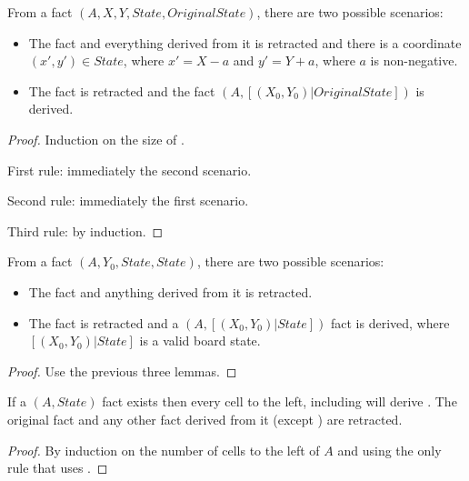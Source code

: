 \begin{lemma}
From a fact $(A, X, Y, State, OriginalState)$, there are
two possible scenarios:

\begin{itemize}
   \item The  fact and everything derived from it is
      retracted and there is a coordinate $(x', y') \in State$, where $x' = X -
      a$ and $y' = Y + a$, where $a$ is non-negative.
   \item The  fact is retracted and the fact
      $(A, [(X_0, Y_0) | OriginalState])$ is derived.
\end{itemize}
\end{lemma}

\begin{proof}
Induction on the size of .

First rule: immediately the second scenario.

Second rule: immediately the first scenario.

Third rule: by induction.
\end{proof}

\begin{theorem}
From a fact $(A, Y_0, State, State)$, there are two possible
scenarios:
   
   \begin{itemize}
      \item The  fact and anything derived from it is retracted.
      \item The  fact is retracted and a $(A,
         [(X_0, Y_0) | State])$ fact is derived, where $[(X_0, Y_0) | State]$ is
         a valid board state.
   \end{itemize}
\end{theorem}
\begin{proof}
Use the previous three lemmas.
\end{proof}

\begin{lemma}
If a $(A, State)$ fact exists then every cell to the left,
including  will derive . The original
 fact and any other fact derived from it (except
) are retracted.
\end{lemma}
\begin{proof}

By induction on the number of cells to the left of $A$ and using the only rule
that uses .

\end{proof}

